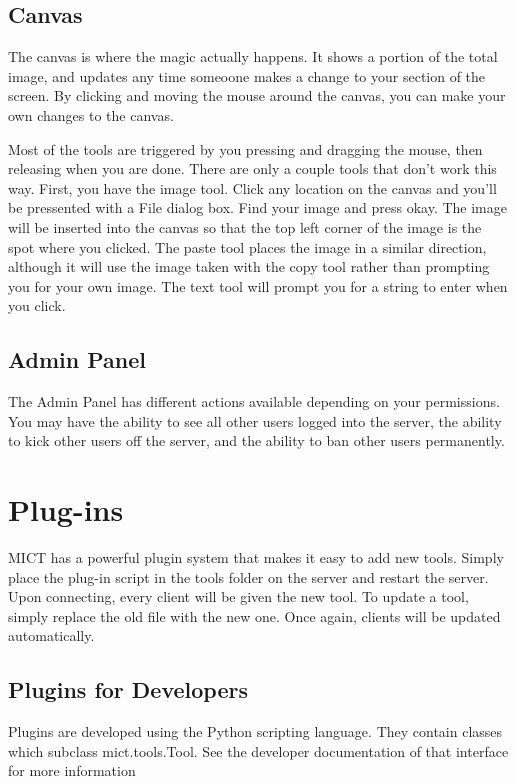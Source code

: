 \documentclass[11pt,oneside,a4paper]{article}
\begin{document}
\subsection{Canvas}
The canvas is where the magic actually happens. It shows a portion of the total
image, and updates any time someoone makes a change to your section of the
screen. By clicking and moving the mouse around the canvas, you can make your
own changes to the canvas.

Most of the tools are triggered by you pressing and dragging the mouse, then
releasing when you are done. There are only a couple tools that don't work this
way. First, you have the image tool. Click any location on the canvas and
you'll be pressented with a File dialog box. Find your image and press okay.
The image will be inserted into the canvas so that the top left corner of the
image is the spot where you clicked. The paste tool places the image in a
similar direction, although it will use the image taken with the copy tool
rather than prompting you for your own image. The text tool will prompt you for
a string to enter when you click.
\subsection{Admin Panel}
The Admin Panel has different actions available depending on your permissions.
You may have the ability to see all other users logged into the server, the
ability to kick other users off the server, and the ability to ban other users
permanently.


\section{Plug-ins}
MICT has a powerful plugin system that makes it easy to add new tools. Simply
place the plug-in script in the tools folder on the server and restart the
server. Upon connecting, every client will be given the new tool. To update a
tool, simply replace the old file with the new one. Once again, clients will be
updated automatically.

\subsection{Plugins for Developers}
Plugins are developed using the Python scripting language. They contain classes
which subclass mict.tools.Tool. See the developer documentation of that
interface for more information
\end{document}
